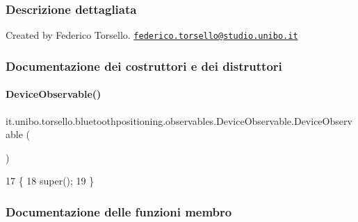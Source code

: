 \subsubsection{Descrizione dettagliata}
Created by Federico Torsello. \href{mailto:federico.torsello@studio.unibo.it}{\tt federico.\+torsello@studio.\+unibo.\+it} 

\subsubsection{Documentazione dei costruttori e dei distruttori}
\hypertarget{classit_1_1unibo_1_1torsello_1_1bluetoothpositioning_1_1observables_1_1DeviceObservable_afd89b681af0ee7708c8d3e830128cd2a_afd89b681af0ee7708c8d3e830128cd2a}{}\label{classit_1_1unibo_1_1torsello_1_1bluetoothpositioning_1_1observables_1_1DeviceObservable_afd89b681af0ee7708c8d3e830128cd2a_afd89b681af0ee7708c8d3e830128cd2a} 
\paragraph{\texorpdfstring{Device\+Observable()}{DeviceObservable()}}
{\footnotesize\ttfamily it.\+unibo.\+torsello.\+bluetoothpositioning.\+observables.\+Device\+Observable.\+Device\+Observable (\begin{DoxyParamCaption}{ }\end{DoxyParamCaption})\hspace{0.3cm}{\ttfamily [private]}}


\begin{DoxyCode}
17                                \{
18         super();
19     \}
\end{DoxyCode}


\subsubsection{Documentazione delle funzioni membro}
\hypertarget{classit_1_1unibo_1_1torsello_1_1bluetoothpositioning_1_1observables_1_1DeviceObservable_ab16792c5848440646624b2a41553954a_ab16792c5848440646624b2a41553954a}{}\label{classit_1_1unibo_1_1torsello_1_1bluetoothpositioning_1_1observables_1_1DeviceObservable_ab16792c5848440646624b2a41553954a_ab16792c5848440646624b2a41553954a} 
